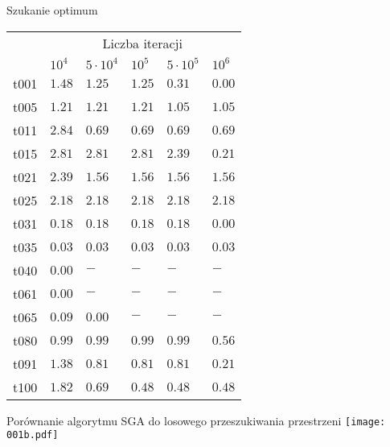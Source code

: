 \documentclass{beamer}
\begin{document}
\begin{frame}{Szukanie optimum}
  \begin{tabular}{l|l|l|l|l|l|} \cline{2-6}
     & \multicolumn{5}{|c|}{Liczba iteracji} \\ \cline{2-6}
                                & $10^4$  & $5\cdot 10^4$ & $10^5$ & $5\cdot 10^5$ & $10^6$ \\ \hline
    \multicolumn{1}{|c|}{t001} 	& $1.48$  & $1.25$        & $1.25$ & $0.31$        & $0.00$ \\ \hline
    \multicolumn{1}{|c|}{t005} 	& $1.21$  & $1.21$        & $1.21$ & $1.05$        & $1.05$ \\ \hline
    \multicolumn{1}{|c|}{t011} 	& $2.84$  & $0.69$        & $0.69$ & $0.69$        & $0.69$ \\ \hline
    \multicolumn{1}{|c|}{t015} 	& $2.81$  & $2.81$        & $2.81$ & $2.39$        & $0.21$ \\ \hline
    \multicolumn{1}{|c|}{t021} 	& $2.39$  & $1.56$        & $1.56$ & $1.56$        & $1.56$ \\ \hline
    \multicolumn{1}{|c|}{t025} 	& $2.18$  & $2.18$        & $2.18$ & $2.18$        & $2.18$ \\ \hline
    \multicolumn{1}{|c|}{t031} 	& $0.18$  & $0.18$        & $0.18$ & $0.18$        & $0.00$ \\ \hline
    \multicolumn{1}{|c|}{t035} 	& $0.03$  & $0.03$        & $0.03$ & $0.03$        & $0.03$ \\ \hline
    \multicolumn{1}{|c|}{t040} 	& $0.00$  & $-$           & $-$    & $-$           & $-$    \\ \hline
    \multicolumn{1}{|c|}{t061} 	& $0.00$  & $-$           & $-$    & $-$           & $-$    \\ \hline
    \multicolumn{1}{|c|}{t065} 	& $0.09$  & $0.00$        & $-$    & $-$           & $-$    \\ \hline
    \multicolumn{1}{|c|}{t080} 	& $0.99$  & $0.99$        & $0.99$ & $0.99$        & $0.56$ \\ \hline
    \multicolumn{1}{|c|}{t091} 	& $1.38$  & $0.81$        & $0.81$ & $0.81$        & $0.21$ \\ \hline  
    \multicolumn{1}{|c|}{t100} 	& $1.82$  & $0.69$        & $0.48$ & $0.48$        & $0.48$ \\ \hline
    \end{tabular}
\end{frame}

\begin{frame}{Porównanie algorytmu SGA do losowego przeszukiwania przestrzeni}
  \texttt{[image: 001b.pdf]}
\end{frame}
\end{document}
